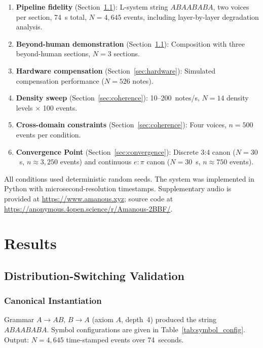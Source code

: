\documentclass[a4paper]{article}
\theoremstyle{definition}
\theoremstyle{remark}
\begin{document}
\begin{enumerate}
    \item \textbf{Pipeline fidelity} (Section~\ref{sec:results_ds}): L-system string $ABAABABA$, two voices per section, 74~s total, $N = 4{,}645$ events, including layer-by-layer degradation analysis.
    \item \textbf{Beyond-human demonstration} (Section~\ref{sec:results_ds}): Composition with three beyond-human sections, $N = 3$ sections.
    \item \textbf{Hardware compensation} (Section~\ref{sec:hardware}): Simulated compensation performance ($N = 526$ notes).
    \item \textbf{Density sweep} (Section~\ref{sec:coherence}): 10--200~notes/s, $N = 14$ density levels $\times$ 100 events.
    \item \textbf{Cross-domain constraints} (Section~\ref{sec:coherence}): Four voices, $n = 500$ events per condition.
    \item \textbf{Convergence Point} (Section~\ref{sec:convergence}): Discrete 3:4 canon ($N = 30$~s, $n \approx 3{,}250$ events) and continuous $e:\pi$ canon ($N = 30$~s, $n \approx 750$ events).
\end{enumerate}

All conditions used deterministic random seeds. The system was implemented in Python with microsecond-resolution timestamps. Supplementary audio is provided at \url{https://www.amanous.xyz}; source code at \url{https://anonymous.4open.science/r/Amanous-2BBF/}.

\section{Results}
\label{sec:results}

\subsection{Distribution-Switching Validation}
\label{sec:results_ds}

\subsubsection{Canonical Instantiation}

Grammar $A \rightarrow AB$, $B \rightarrow A$ (axiom $A$, depth~4) produced the string $ABAABABA$. Symbol configurations are given in Table~\ref{tab:symbol_config}. Output: $N = 4{,}645$ time-stamped events over 74~seconds.
\end{document}
